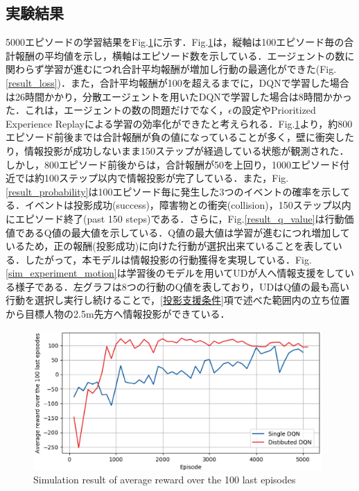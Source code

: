 \documentclass[12pt]{sonota/aislab}
\begin{document}
\subsection{実験結果}
5000エピソードの学習結果をFig.\ref{result_reward}に示す．Fig.\ref{result_reward}は，縦軸は100エピソード毎の合計報酬の平均値を示し，横軸はエピソード数を示している．エージェントの数に関わらず学習が進むにつれ合計平均報酬が増加し行動の最適化ができた(Fig.\ref{result_loss})．また，合計平均報酬が100を超えるまでに，DQNで学習した場合は26時間かかり，分散エージェントを用いたDQNで学習した場合は8時間かかった．これは，エージェントの数の問題だけでなく，$\epsilon$の設定やPrioritized Experience Replayによる学習の効率化ができたと考えられる．Fig.\ref{result_reward}より，約800エピソード前後までは合計報酬が負の値になっていることが多く，壁に衝突したり，情報投影が成功しないまま150ステップが経過している状態が観測された．しかし，800エピソード前後からは，合計報酬が50を上回り，1000エピソード付近では約100ステップ以内で情報投影が完了している．また，Fig.\ref{result_probability}は100エピソード毎に発生した3つのイベントの確率を示してる．イベントは投影成功(success)，障害物との衝突(collision)，150ステップ以内にエピソード終了(past 150 steps)である．さらに，Fig.\ref{result_q_value}は行動価値であるQ値の最大値を示している．Q値の最大値は学習が進むにつれ増加しているため，正の報酬(投影成功)に向けた行動が選択出来ていることを表している．したがって，本モデルは情報投影の行動獲得を実現している．Fig.\ref{sim_experiment_motion}は学習後のモデルを用いてUDが人へ情報支援をしている様子である．左グラフは8つの行動のQ値を表しており，UDはQ値の最も高い行動を選択し実行し続けることで，\ref{投影支援条件}項で述べた範囲内の立ち位置から目標人物の2.5m先方へ情報投影ができている．

\begin{figure}[t]
\begin{center}
\includegraphics[clip, width=11cm]{figs/result_multi_reward.eps}
\caption{Simulation result of average reward over the 100 last episodes}
\label{result_reward}
\end{center}
\end{figure}
\end{document}
